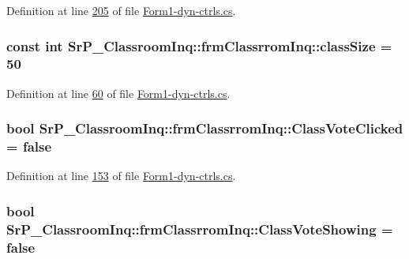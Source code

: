 \-Definition at line \hyperlink{_form1-dyn-ctrls_8cs_source_l00205}{205} of file \hyperlink{_form1-dyn-ctrls_8cs_source}{\-Form1-\/dyn-\/ctrls.\-cs}.

\hypertarget{class_sr_p___classroom_inq_1_1frm_classrrom_inq_a78d9aab335edfe53d39036b9d89928a8}{
\subsubsection[{class\-Size}]{\setlength{\rightskip}{0pt plus 5cm}const int {\bf \-Sr\-P\-\_\-\-Classroom\-Inq\-::frm\-Classrrom\-Inq\-::class\-Size} = 50}}
\label{class_sr_p___classroom_inq_1_1frm_classrrom_inq_a78d9aab335edfe53d39036b9d89928a8}


\-Definition at line \hyperlink{_form1-dyn-ctrls_8cs_source_l00060}{60} of file \hyperlink{_form1-dyn-ctrls_8cs_source}{\-Form1-\/dyn-\/ctrls.\-cs}.

\hypertarget{class_sr_p___classroom_inq_1_1frm_classrrom_inq_a1e2c8341b4d2988c61648bea9a4c412b}{
\subsubsection[{\-Class\-Vote\-Clicked}]{\setlength{\rightskip}{0pt plus 5cm}bool {\bf \-Sr\-P\-\_\-\-Classroom\-Inq\-::frm\-Classrrom\-Inq\-::\-Class\-Vote\-Clicked} = false}}
\label{class_sr_p___classroom_inq_1_1frm_classrrom_inq_a1e2c8341b4d2988c61648bea9a4c412b}


\-Definition at line \hyperlink{_form1-dyn-ctrls_8cs_source_l00153}{153} of file \hyperlink{_form1-dyn-ctrls_8cs_source}{\-Form1-\/dyn-\/ctrls.\-cs}.

\hypertarget{class_sr_p___classroom_inq_1_1frm_classrrom_inq_ae23aa3324c19688aa8d35b0217cf9605}{
\subsubsection[{\-Class\-Vote\-Showing}]{\setlength{\rightskip}{0pt plus 5cm}bool {\bf \-Sr\-P\-\_\-\-Classroom\-Inq\-::frm\-Classrrom\-Inq\-::\-Class\-Vote\-Showing} = false}}
\label{class_sr_p___classroom_inq_1_1frm_classrrom_inq_ae23aa3324c19688aa8d35b0217cf9605}


